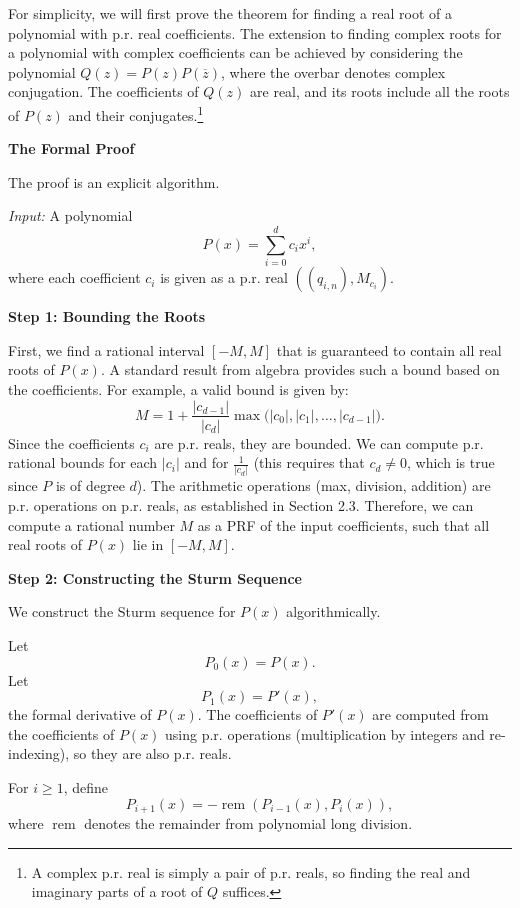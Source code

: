 \documentclass[12pt, a4paper]{article}
\begin{document}
For simplicity, we will first prove the theorem for finding a real root of a polynomial with p.r. real coefficients. The extension to finding complex roots for a polynomial with complex coefficients can be achieved by considering the polynomial $Q(z) = P(z)P(\overline{z})$, where the overbar denotes complex conjugation. The coefficients of $Q(z)$ are real, and its roots include all the roots of $P(z)$ and their conjugates.\footnote{A complex p.r. real is simply a pair of p.r. reals, so finding the real and imaginary parts of a root of $Q$ suffices.}

\medskip

\textbf{The Formal Proof}

The proof is an explicit algorithm.

\medskip

\textit{Input:} A polynomial 
\[
P(x) = \sum_{i=0}^d c_i x^i,
\]
where each coefficient $c_i$ is given as a p.r. real $((q_{i,n}), M_{c_i})$.

\medskip

\textbf{Step 1: Bounding the Roots}

First, we find a rational interval $[-M, M]$ that is guaranteed to contain all real roots of $P(x)$. A standard result from algebra provides such a bound based on the coefficients. For example, a valid bound is given by:
\[
M = 1 + \frac{|c_{d-1}|}{|c_d|} \max \big(|c_0|, |c_1|, \ldots, |c_{d-1}|\big).
\]
Since the coefficients $c_i$ are p.r. reals, they are bounded. We can compute p.r. rational bounds for each $|c_i|$ and for $\frac{1}{|c_d|}$ (this requires that $c_d \neq 0$, which is true since $P$ is of degree $d$). The arithmetic operations (max, division, addition) are p.r. operations on p.r. reals, as established in Section 2.3. Therefore, we can compute a rational number $M$ as a PRF of the input coefficients, such that all real roots of $P(x)$ lie in $[-M, M]$.

\medskip

\textbf{Step 2: Constructing the Sturm Sequence}

We construct the Sturm sequence for $P(x)$ algorithmically.

Let
\[
P_0(x) = P(x).
\]
Let
\[
P_1(x) = P'(x),
\]
the formal derivative of $P(x)$. The coefficients of $P'(x)$ are computed from the coefficients of $P(x)$ using p.r. operations (multiplication by integers and re-indexing), so they are also p.r. reals.

For $i \geq 1$, define
\[
P_{i+1}(x) = -\operatorname{rem}(P_{i-1}(x), P_i(x)),
\]
where $\operatorname{rem}$ denotes the remainder from polynomial long division.
\end{document}
